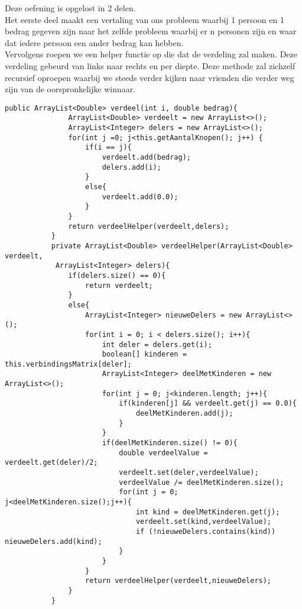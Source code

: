 \begin{Oplossing}{10.9}
Deze oefening is opgelost in 2 delen. \\ Het eerste deel maakt een vertaling van ons probleem waarbij 1 persoon en 1 bedrag gegeven zijn naar het zelfde probleem waarbij er n personen zijn en waar dat iedere persoon een ander bedrag kan hebben.\\
Vervolgens roepen we een helper functie op die dat de verdeling zal maken. Deze verdeling gebeurd van links naar rechts en per diepte. Deze methode zal zichzelf recursief oproepen waarbij we steeds verder kijken naar vrienden die verder weg zijn van de oorspronkelijke winnaar.
     \begin{lstlisting}[caption={verdeel(i, bedrag) methode}, label=bstaddnode]
          public ArrayList<Double> verdeel(int i, double bedrag){
               ArrayList<Double> verdeelt = new ArrayList<>();
               ArrayList<Integer> delers = new ArrayList<>();
               for(int j =0; j<this.getAantalKnopen(); j++) {
                   if(i == j){
                       verdeelt.add(bedrag);
                       delers.add(i);
                   }
                   else{
                       verdeelt.add(0.0);
                   }
               }
               return verdeelHelper(verdeelt,delers);
           }
           private ArrayList<Double> verdeelHelper(ArrayList<Double> verdeelt,
            ArrayList<Integer> delers){
               if(delers.size() == 0){
                   return verdeelt;
               }
               else{
                   ArrayList<Integer> nieuweDelers = new ArrayList<>();
                   for(int i = 0; i < delers.size(); i++){
                       int deler = delers.get(i);
                       boolean[] kinderen = this.verbindingsMatrix[deler];
                       ArrayList<Integer> deelMetKinderen = new ArrayList<>();
                       for(int j = 0; j<kinderen.length; j++){
                           if(kinderen[j] && verdeelt.get(j) == 0.0){
                               deelMetKinderen.add(j);
                           }
                       }
                       if(deelMetKinderen.size() != 0){
                           double verdeelValue = verdeelt.get(deler)/2;
                           verdeelt.set(deler,verdeelValue);
                           verdeelValue /= deelMetKinderen.size();
                           for(int j = 0; j<deelMetKinderen.size();j++){
                               int kind = deelMetKinderen.get(j);
                               verdeelt.set(kind,verdeelValue);
                               if (!nieuweDelers.contains(kind)) nieuweDelers.add(kind);
                           }
                       }
                   }
                   return verdeelHelper(verdeelt,nieuweDelers);
               }
           }
          \end{lstlisting}
\end{Oplossing}
\begin{Oplossing}{10.10}

\end{Oplossing}
